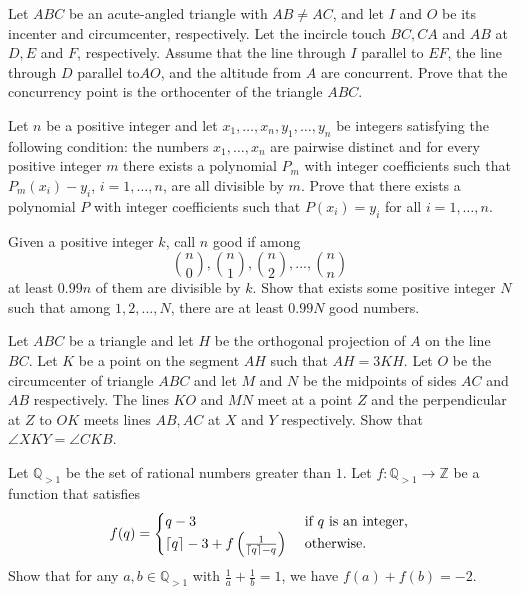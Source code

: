 \documentclass[11pt]{scrartcl}
\begin{document}
\begin{problem}[318208660266829737]
Let $ABC$ be an acute-angled triangle with $AB \ne AC$, and let $I$ and $O$ be its incenter and circumcenter, respectively. Let the incircle touch $BC, CA$ and $AB$ at $D, E$ and $F$, respectively. Assume that the line through $I$ parallel to $EF$, the line through $D$ parallel to$ AO$, and the altitude from $A$ are concurrent. Prove that the concurrency point is the orthocenter of the triangle $ABC$.
\end{problem}
\begin{problem}[320133496959351613]
Let $n$ be a positive integer and let $x_1,\ldots,x_n,y_1,\ldots,y_n$ be integers satisfying the following
condition: the numbers $x_1,\ldots,x_n$ are pairwise distinct and for every positive integer $m$ there
exists a polynomial $P_m$ with integer coefficients such that $P_m(x_i) - y_i$, $i=1,\ldots,n$, are all divisible by $m$. Prove that there exists a polynomial $P$ with integer coefficients such that $P(x_i) = y_i$ for all $i=1,\ldots,n$.
\end{problem}
\begin{problem}[420149375714841446]
Given a positive integer $k$, call $n$ good if among$$\binom{n}{0},\binom{n}{1},\binom{n}{2},...,\binom{n}{n}$$at least $0.99n$ of them are divisible by $k$. Show that exists some positive integer $N$ such that among $1,2,...,N$, there are at least $0.99N$ good numbers.
\end{problem}
\begin{problem}[493493847475466779]
Let $ABC$ be a triangle and let $H$ be the orthogonal projection of $A$ on the line $BC$. Let $K$ be a point on the segment $AH$ such that $AH = 3 KH$. Let $O$ be the circumcenter of triangle $ABC$ and let $M$ and $N$ be the midpoints of sides $AC$ and $AB$ respectively. The lines $KO$ and $MN$ meet at a point $Z$ and the perpendicular at $Z$ to $OK$ meets lines $AB, AC$ at $X$ and $Y$ respectively. Show that $\angle XKY = \angle CKB$.
\end{problem}
\begin{problem}[521941955566221852]
Let $\mathbb{Q}_{>1}$ be the set of rational numbers greater than $1$. Let $f:\mathbb{Q}_{>1}\to \mathbb{Z}$ be a function that satisfies
\[f(q)=\begin{cases}
q-3&\textup{ if }q\textup{ is an integer,}\\
\lceil q\rceil-3+f\left(\frac{1}{\lceil q\rceil-q}\right)&\textup{ otherwise.}
\end{cases}\]Show that for any $a,b\in\mathbb{Q}_{>1}$ with $\frac{1}{a}+\frac{1}{b}=1$, we have $f(a)+f(b)=-2$.
\end{problem}
\end{document}
